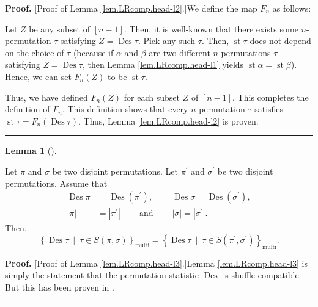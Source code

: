 \documentclass[numbers=enddot,12pt,final,onecolumn,notitlepage]{scrartcl}%
\theoremstyle{definition}
\newtheorem{lem}[theo]{Lemma}
\newenvironment{lemma}[1][]
{\begin{lem}[#1]\begin{leftbar}}
{\end{leftbar}\end{lem}}
\newenvironment{proof}[1][Proof]{\noindent\textbf{#1.} }{\ \rule{0.5em}{0.5em}}
\newenvironment{verlong}{}{}
\begin{document}
\begin{verlong}
\begin{proof}
[Proof of Lemma \ref{lem.LRcomp.head-l2}.]We define the map $F_{n}$ as follows:

Let $Z$ be any subset of $\left[  n-1\right]  $. Then, it is well-known that
there exists some $n$-permutation $\tau$ satisfying $Z=\operatorname{Des}
\tau$. Pick any such $\tau$. Then, $\operatorname{st} \tau$
does not depend on the choice of $\tau$ (because if $\alpha$ and $\beta$ are
two different $n$-permutations $\tau$ satisfying $Z=\operatorname{Des}\tau$,
then Lemma \ref{lem.LRcomp.head-l1} yields
$\operatorname{st} \alpha = \operatorname{st} \beta$).
Hence, we can set
$F_{n}\left(  Z\right)  $ to be $\operatorname{st} \tau$.

Thus, we have defined $F_{n}\left(  Z\right)  $ for each subset $Z$ of
$\left[  n-1\right]  $. This completes the definition of $F_{n}$. This
definition shows that every $n$-permutation $\tau$ satisfies
$\operatorname{st} \tau   =F_{n}\left(  \operatorname{Des}
\tau\right)  $. Thus, Lemma \ref{lem.LRcomp.head-l2} is proven.
\end{proof}

\begin{lemma}
\label{lem.LRcomp.head-l3}Let $\pi$ and $\sigma$ be two disjoint permutations.
Let $\pi^{\prime}$ and $\sigma^{\prime}$ be two disjoint permutations. Assume
that%
\begin{align*}
\operatorname{Des}\pi &  =\operatorname{Des} \left( \pi^{\prime} \right)
,\ \ \ \ \ \ \ \ \ \ \operatorname{Des}\sigma = \operatorname{Des}
\left( \sigma^{\prime} \right),\\
\left\vert \pi\right\vert  &  =\left\vert \pi^{\prime}\right\vert
\ \ \ \ \ \ \ \ \ \ \text{and}
\ \ \ \ \ \ \ \ \ \ \left\vert \sigma\right\vert
=\left\vert \sigma^{\prime}\right\vert .
\end{align*}
Then,
\[
\left\{  \operatorname{Des}\tau\ \mid\ \tau\in S\left(  \pi,\sigma\right)
\right\}  _{\operatorname*{multi}}=\left\{  \operatorname{Des}\tau
\ \mid\ \tau\in S\left(  \pi^{\prime},\sigma^{\prime}\right)  \right\}
_{\operatorname*{multi}}.
\]

\end{lemma}

\begin{proof}
[Proof of Lemma \ref{lem.LRcomp.head-l3}.]Lemma \ref{lem.LRcomp.head-l3} is
simply the statement that the permutation statistic $\operatorname{Des}$ is
shuffle-compatible. But this has been proven in \cite[\S 2.4]{part1}.
\end{proof}


\end{verlong}
\end{document}
